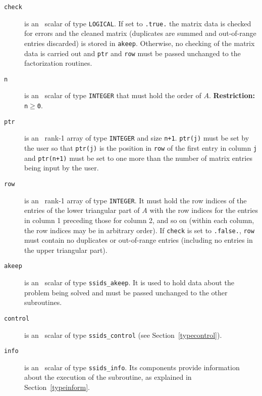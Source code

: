 \documentclass{spral}
\begin{document}
\vspace*{-3mm}
\begin{description}

\item[\texttt{check}] is an \intentin\ scalar of
type  {\tt LOGICAL}. If set to {\tt .true.} the matrix
data is checked for errors and the cleaned matrix
(duplicates are summed and out-of-range entries
discarded) is stored in {\tt akeep}.
Otherwise, no checking of the matrix data is carried out
and {\tt ptr} and {\tt row} must be passed unchanged to the factorization routines.

\item[\texttt{n}] is an \intentin\ scalar of
type  {\tt INTEGER} that must hold the order of $A$.
{\bf Restriction:} {\tt n$\geq$0}.

\item[\texttt{ptr}] is an \intentin\ rank-1 array of type  {\tt INTEGER} and
size {\tt n+1}. {\tt ptr(j)}  must be set by the user
so that {\tt ptr(j)} is the position in {\tt row}
of the first entry in column {\tt j} and {\tt ptr(n+1)} must be set to one
more than the number of matrix entries being input by the user.

\item[\texttt{row}] is an \intentin\ rank-1 array of
type  {\tt INTEGER}. It must hold the row indices of the entries
of the lower triangular part of $A$ with the row indices for
the entries in column 1
preceding those for column 2, and so on (within each column, the row indices
may be in arbitrary order). If {\tt check} is set to {\tt .false.}, {\tt row}
must contain no duplicates or out-of-range entries (including
no entries in the upper triangular part).

\item[\texttt{akeep}]  is an \intentout\ scalar of type
{\tt ssids\_akeep}. It is used to hold data about the problem being
solved and must be passed unchanged to the other subroutines.

\item[\texttt{control}] is an \intentin\ scalar of type {\tt ssids\_control}
(see Section~\ref{typecontrol}).

\item[\texttt{info}] is an \intentout\ scalar of type
{\tt ssids\_info}. Its components provide information about the execution
of the subroutine, as explained in Section~\ref{typeinform}.


\end{description}
\end{document}
